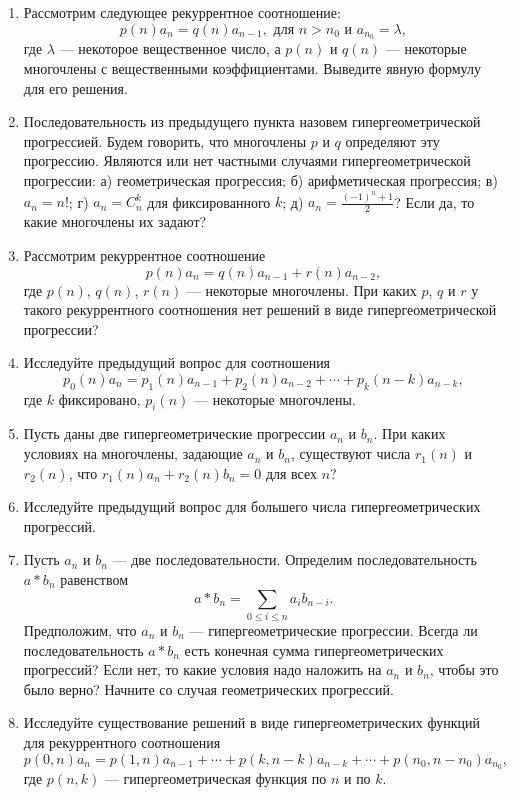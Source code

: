 \begin{enumerate}
\item Рассмотрим следующее рекуррентное соотношение:
$$p(n)a_{n}=q(n)a_{n-1}, \text{ для $n> n_0$ и } a_{n_0}=\lambda,$$
где $\lambda$ --- некоторое вещественное число, а $p(n)$ и $q(n)$ --- некоторые многочлены с вещественными коэффициентами. Выведите явную формулу для его решения.
\item Последовательность из предыдущего пункта назовем гипергеометрической прогрессией. Будем говорить, что многочлены $p$ и $q$ определяют эту прогрессию.  Являются или нет частными случаями гипергеометрической прогрессии: а) геометрическая прогрессия;  б) арифметическая прогрессия;  в) $a_n=n!$;  г) $a_n=C_n^k$ для фиксированного $k$;  д) $a_n= \tfrac{(-1)^n+1}{2}$? Если да, то какие многочлены их задают?
\item Рассмотрим рекуррентное соотношение 
$$p(n)a_{n}=q(n)a_{n-1} +r(n)a_{n-2},$$
где $p(n)$, $q(n)$, $r(n)$ --- некоторые многочлены. При каких $p$, $q$ и $r$ у такого рекуррентного соотношения нет решений в виде гипергеометрической прогрессии? 
\item Исследуйте предыдущий вопрос для соотношения 
$$p_0(n)a_{n}=p_1(n)a_{n-1} + p_2(n)a_{n-2}+\cdots+p_k(n-k)a_{n-k},$$
где $k$ фиксировано, $p_i(n)$ --- некоторые многочлены.
\item Пусть даны две гипергеометрические прогрессии $a_n$ и $b_n$. При каких условиях на многочлены, задающие $a_n$ и $b_n$, существуют числа $r_1(n)$ и $r_2(n)$, что $r_1(n) a_n + r_2(n) b_n=0$ для всех $n$? 
\item Исследуйте предыдущий вопрос для большего числа гипергеометрических прогрессий.
\item Пусть $a_n$ и $b_n$ --- две последовательности. Определим последовательность $a*b_n$ равенством 
$$a*b_n=\sum_{0\leq i\leq n} a_i b_{n-i}.$$
Предположим, что $a_n$ и $b_n$ --- гипергеометрические прогрессии. Всегда ли последовательность $a*b_n$ есть конечная сумма гипергеометрических прогрессий?  Если нет, то какие условия надо наложить на $a_n$ и $b_n$, чтобы это было верно? Начните со случая геометрических прогрессий.
\item Исследуйте существование решений в виде гипергеометрических функций для рекуррентного соотношения 
$$p(0,n)a_{n}=p(1,n)a_{n-1} +\cdots+p(k,n-k)a_{n-k}+ \cdots + p(n_0,n-n_0)a_{n_0},$$
где $p(n,k)$ --- гипергеометрическая функция по $n$ и по $k$.
\end{enumerate}


